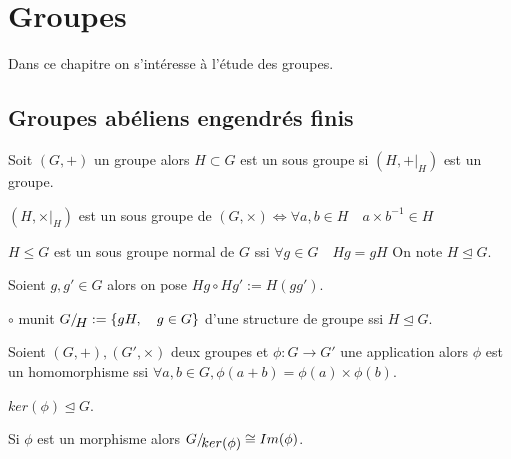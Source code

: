 \chapter{Groupes}
\label{cha:groupes}

Dans ce chapitre on s'intéresse à l'étude des groupes.

\section{Groupes abéliens engendrés finis}

 \begin{definition}
   \label{g:def:1}
    Soit $(G,+)$ un groupe alors $H\subset G$ est un sous groupe si $(H,+|_{ H })$ est un groupe.
 \end{definition}
 
 \begin{lemma}
    \label{g:lem:23}
    $(H,\times|_H)$ est un sous groupe de $(G,\times) \Leftrightarrow \forall a,b \in H\quad a\times b^{-1} \in H$
   \end{lemma}
   
    \begin{definition}
    \label{def:491}
    $H\le G$ est un sous groupe normal de $G$ ssi $\forall g \in G\quad Hg=gH$ On note $H\unlhd G$.
     \end{definition}
     
      \begin{definition}
    \label{def:492}
    Soient $g,g' \in G$ alors on pose $Hg \circ Hg' := H(gg')$.
     \end{definition}
     
     \begin{theorem}
    \label{g:thr:28}
    $\circ$  munit $G/\!\raisebox{-.65ex}{\ensuremath{{H}}}  := \left\{ gH,\quad g\in G \right\}$ d'une structure de groupe ssi $H\unlhd G$. 
    \end{theorem}
    
       \begin{definition}
    \label{def:493}
    Soient $(G,+),(G',\times)$ deux groupes et $\phi :G\rightarrow G'$ une application alors $\phi$ est un homomorphisme ssi 
    $\forall a,b \in G, \phi(a+b)=\phi(a) \times \phi(b)$.
    \end{definition}
    
    \begin{remark}
    $ker(\phi) \unlhd G$.
    \end{remark}
    
     \begin{theorem}
    Si $\phi$ est un morphisme alors $G/\!\raisebox{-.65ex}{\ensuremath{{ker(\phi)}}} \cong Im(\phi)$.
     \end{theorem}
     
